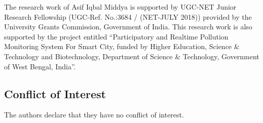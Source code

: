 \documentclass[twocolumn]{svjour3}          %
\begin{document}
The research work of Asif Iqbal Middya is supported by UGC-NET Junior Research Fellowship (UGC-Ref. No.:3684 / (NET-JULY 2018)) provided by the University Grants Commission, Government of India. This research work is also supported by the project entitled ``Participatory and Realtime Pollution Monitoring System For Smart City, funded by Higher Education, Science \& Technology and Biotechnology, Department of Science \& Technology, Government of West Bengal, India''.

\subsection*{\textbf{Conflict of Interest}}
The authors declare that they have no conflict of interest.

\footnotesize{
 
% 
}
\end{document}

